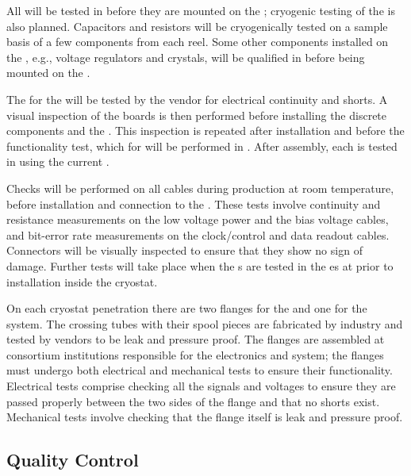 All  will be tested in  before they are mounted
on the ; cryogenic testing of the  is also
planned.  Capacitors and resistors will be
cryogenically tested on a sample basis of a few components from each
reel. Some other components installed on the , e.g., 
voltage regulators and crystals, will be qualified in 
before being mounted on the .

The  for the  will be tested by the
vendor for electrical continuity and shorts. A visual inspection of
the boards is then performed before installing the discrete components
and the . This inspection is repeated after
installation and before the functionality test, which for 
will be performed in .  After assembly, each 
is tested in  using the current .

Checks will be performed on all cables during production at room
temperature, before installation and connection to the
. These tests  involve continuity and resistance
measurements on the low voltage power and the bias voltage cables, and
bit-error rate measurements on the clock/control and data readout
cables. Connectors will be visually inspected to ensure that they show
no sign of damage. Further tests will take place when the s
are tested in the \coldbox{}es at  prior to installation
inside the cryostat.

On each cryostat penetration there are two flanges for the 
and one for the  system. The crossing tubes with their spool
pieces are fabricated by industry and tested by vendors to be leak and
pressure proof. The flanges are assembled at consortium institutions
responsible for the  electronics and  system; the
flanges must undergo both electrical and mechanical tests to ensure
their functionality. Electrical tests comprise checking all the
signals and voltages to ensure they are passed properly between the
two sides of the flange and that no shorts exist. Mechanical tests
involve checking that the flange itself is leak and pressure proof.

\subsection{ Quality Control}

